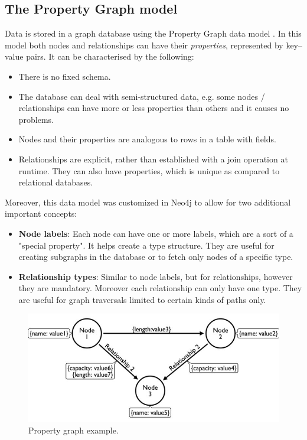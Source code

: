 \documentclass[12pt]{report}
\begin{document}
\subsection{The Property Graph model}

Data is stored in a graph database using the Property Graph data model \cite{learning_neo4j}. In this model both nodes and relationships can have their \textit{properties}, represented by key--value pairs. It can be characterised by the following:
\begin{itemize}
\item There is no fixed schema.
\item The database can deal with semi-structured data, e.g. some nodes / relationships can have more or less properties than others and it causes no problems.
\item Nodes and their properties are analogous to rows in a table with fields.
\item Relationships are explicit, rather than established with a join operation at runtime. They can also have properties, which is unique as compared to relational databases.
\end{itemize}

Moreover, this data model was customized in Neo4j to allow for two additional important concepts:
\begin{itemize}
\item {\bf Node labels}: Each node can have one or more labels, which are a sort of a "special property". It helps create a type structure. They are useful for creating subgraphs in the database or to fetch only nodes of a specific type.
\item {\bf Relationship types}: Similar to node labels, but for relationships, however they are mandatory. Moreover each relationship can only have one type. They are useful for graph traversals limited to certain kinds of paths only.
\end{itemize}

\begin{figure}[!t]
\centering
\includegraphics[width=\textwidth]{property_graph2.jpg} 
\caption[Property graph example.]{Property graph example.\footnotemark{}}
\label{fig.property_graph}
\end{figure}
\end{document}
